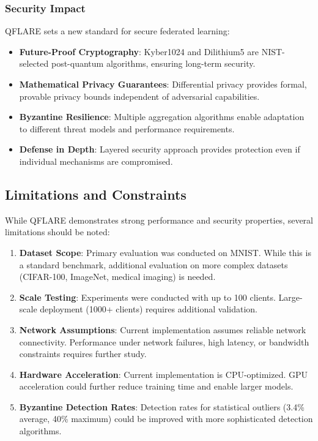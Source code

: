 \documentclass[12pt,a4paper]{article}
\begin{document}
\subsubsection{Security Impact}

QFLARE sets a new standard for secure federated learning:

\begin{itemize}
    \item \textbf{Future-Proof Cryptography}: Kyber1024 and Dilithium5 are NIST-selected post-quantum algorithms, ensuring long-term security.
    
    \item \textbf{Mathematical Privacy Guarantees}: Differential privacy provides formal, provable privacy bounds independent of adversarial capabilities.
    
    \item \textbf{Byzantine Resilience}: Multiple aggregation algorithms enable adaptation to different threat models and performance requirements.
    
    \item \textbf{Defense in Depth}: Layered security approach provides protection even if individual mechanisms are compromised.
\end{itemize}

\subsection{Limitations and Constraints}

While QFLARE demonstrates strong performance and security properties, several limitations should be noted:

\begin{enumerate}
    \item \textbf{Dataset Scope}: Primary evaluation was conducted on MNIST. While this is a standard benchmark, additional evaluation on more complex datasets (CIFAR-100, ImageNet, medical imaging) is needed.
    
    \item \textbf{Scale Testing}: Experiments were conducted with up to 100 clients. Large-scale deployment (1000+ clients) requires additional validation.
    
    \item \textbf{Network Assumptions}: Current implementation assumes reliable network connectivity. Performance under network failures, high latency, or bandwidth constraints requires further study.
    
    \item \textbf{Hardware Acceleration}: Current implementation is CPU-optimized. GPU acceleration could further reduce training time and enable larger models.
    
    \item \textbf{Byzantine Detection Rates}: Detection rates for statistical outliers (3.4\% average, 40\% maximum) could be improved with more sophisticated detection algorithms.
\end{enumerate}
\end{document}
